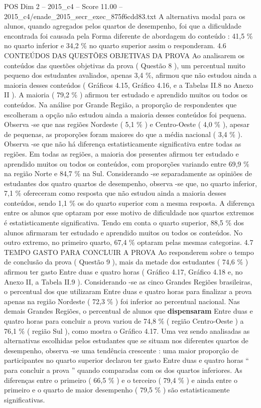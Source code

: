\begin{textsample}{POS Dim 2 – 2015\_c4 – Score 11.00 – 2015\_c4/enade\_2015\_secr\_exec\_875f6cdd83.txt}
A alternativa modal para os alunos, quando agregados pelos quartos de desempenho, foi que a dificuldade encontrada foi causada pela Forma diferente de abordagem do conteúdo : 41,5 \% no quarto inferior e 34,2 \% no quarto superior assim o responderam. 4.6 CONTEÚDOS DAS QUESTÕES OBJETIVAS DA PROVA Ao analisarem os conteúdos das questões objetivas da prova ( Questão 8 ), um percentual muito pequeno dos estudantes avaliados, apenas 3,4 \%, afirmou que não estudou ainda a maioria desses conteúdos ( Gráficos 4.15, Gráfico 4.16, e a Tabelas II.8 no Anexo II ).
A maioria ( 79,2 \% ) afirmou ter estudado e aprendido muitos ou todos os conteúdos.
Na análise por Grande Região, a proporção de respondentes que escolheram a opção não estudou ainda a maioria desses conteúdos foi pequena.
Observa -se que nas regiões Nordeste ( 5,1 \% ) e Centro-Oeste ( 4,0 \% ), apesar de pequenas, as proporções foram maiores do que a média nacional ( 3,4 \% ).
Observa -se que não há diferença estatisticamente significativa entre todas as regiões.
Em todas as regiões, a maioria dos presentes afirmou ter estudado e aprendido muitos ou todos os conteúdos, com proporções variando entre 69,9 \% na região Norte e 84,7 \% na Sul.
Considerando -se separadamente as opiniões de estudantes dos quatro quartos de desempenho, observa -se que, no quarto inferior, 7,1 \% ofereceram como resposta que não estudou ainda a maioria desses conteúdos, sendo 1,1 \% os do quarto superior com a mesma resposta.
A diferença entre os alunos que optaram por esse motivo de dificuldade nos quartos extremos é estatisticamente significativa.
Tendo em conta o quarto superior, 88,5 \% dos alunos afirmaram ter estudado e aprendido muitos ou todos os conteúdos.
No outro extremo, no primeiro quarto, 67,4 \% optaram pelas mesmas categorias. 4.7 TEMPO GASTO PARA CONCLUIR A PROVA Ao responderem sobre o tempo de conclusão da prova ( Questão 9 ), mais da metade dos estudantes ( 74,6 \% ) afirmou ter gasto Entre duas e quatro horas ( Gráfico 4.17, Gráfico 4.18 e, no Anexo II, a Tabela II.9 ).
Considerando -se as cinco Grandes Regiões brasileiras, o percentual dos que utilizaram Entre duas e quatro horas para finalizar a prova apenas na região Nordeste ( 72,3 \% ) foi inferior ao percentual nacional.
Nas demais Grandes Regiões, o percentual de alunos que \textbf{dispensaram} Entre duas e quatro horas para concluir a prova variou de 74,8 \% ( região Centro-Oeste ) a 76,1 \% ( região Sul ), como mostra o Gráfico 4.17.
Uma vez sendo analisadas as alternativas escolhidas pelos estudantes que se situam nos diferentes quartos de desempenho, observa -se uma tendência crescente : uma maior proporção de participantes no quarto superior declarou ter gasto Entre duas e quatro horas “ para concluir a prova ” quando comparadas com os dos quartos inferiores.
As diferenças entre o primeiro ( 66,5 \% ) e o terceiro ( 79,4 \% ) e ainda entre o primeiro e o quarto de maior desempenho ( 79,5 \% ) são estatisticamente significativas.

\end{textsample}
